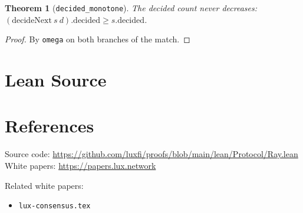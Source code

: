 \documentclass[11pt]{article}
\newtheorem{theorem}{Theorem}
\begin{document}
\begin{theorem}[\texttt{decided\_monotone}]
The decided count never decreases: $(\text{decideNext}~s~d).\text{decided} \geq s.\text{decided}$.
\end{theorem}
\begin{proof}
By \texttt{omega} on both branches of the match.
\end{proof}


\section{Lean Source}


\section{References}
\noindent Source code: \url{https://github.com/luxfi/proofs/blob/main/lean/Protocol/Ray.lean}\\
\noindent White papers: \url{https://papers.lux.network}

\noindent Related white papers:
\begin{itemize}
  \item \texttt{lux-consensus.tex}
\end{itemize}
\end{document}
